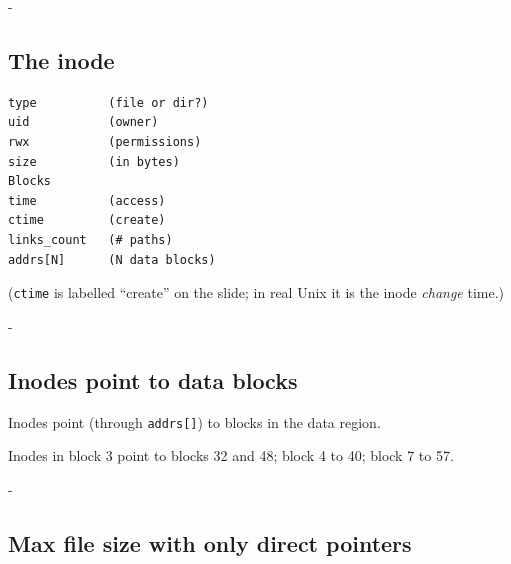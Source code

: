 \documentclass[11pt,a4paper]{article}
\makeatletter
\newcommand{\keepspace}[1]{\par\penalty-100\begingroup
  \setlength{\dimen@}{#1}\dimen@ii\pagegoal\advance\dimen@ii-\pagetotal
  \ifdim\dimen@>\dimen@ii\ifdim\dimen@ii>\z@\vfil\fi\break\fi\endgroup}
\newcommand{\fsgrid}[3]{%
  \foreach \bb in {0,...,63} {
    \pgfmathtruncatemacro{\rr}{\bb/16}
    \pgfmathtruncatemacro{\cc}{mod(\bb,16)}
    \pgfmathsetmacro{\xx}{\cc*0.71 + (\cc>7)*0.5}
    \ifnum\bb<8
      \node[blk, fill=white] (b\bb) at (\xx, -\rr*1.0) {};
    \else
      \node[blk, fill=#2] (b\bb) at (\xx, -\rr*1.0) {#1};
    \fi
  }
  \foreach \n/\l/\f in {#3} { \node[blk, \f] at (b\n) {\l}; }
  \foreach \rr in {0,...,3} {
    \foreach \s/\e in {0/7,8/15} {
      \pgfmathtruncatemacro{\bs}{\rr*16+\s}
      \pgfmathtruncatemacro{\be}{\rr*16+\e}
      \node[font=\scriptsize, inner sep=1pt, below=0pt of b\bs.south] {\bs};
      \node[font=\scriptsize, inner sep=1pt, below=0pt of b\be.south] {\be};
    }
  }
}
\makeatother
\begin{document}
\keepspace{14\baselineskip}
\subsection{The inode}


\begin{lstlisting}[language={}, numbers=none]
type          (file or dir?)
uid           (owner)
rwx           (permissions)
size          (in bytes)
Blocks
time          (access)
ctime         (create)
links_count   (# paths)
addrs[N]      (N data blocks)
\end{lstlisting}

{\small (\texttt{ctime} is labelled ``create'' on the slide; in real Unix it is
the inode \emph{change} time.)}

\keepspace{8\baselineskip}
\subsection{Inodes point to data blocks}

Inodes point (through \texttt{addrs[]}) to blocks in the data region.

\begin{center}

{\small Inodes in block 3 point to blocks 32 and 48; block 4 to 40; block 7 to 57.}
\end{center}

\keepspace{8\baselineskip}
\subsection{Max file size with only direct pointers}
\end{document}
